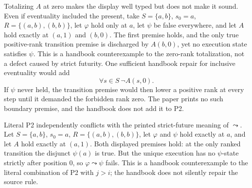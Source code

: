 Totalizing \(A\) at zero makes the display well typed but does not make it
sound.  Even if eventuality included the present, take
\(S=\{a,b\}\), \(s_0=a\), \(R=\{(a,b),(b,b)\}\), let \(\varphi\) hold only at
\(a\), let \(\psi\) be false everywhere, and let \(A\) hold exactly at
\((a,1)\) and \((b,0)\).  The first premise holds, and the only true
positive-rank transition premise is discharged by \(A(b,0)\), yet no execution
state satisfies \(\psi\).  This is a handbook counterexample to the zero-rank
totalization, not a defect caused by strict futurity.  One sufficient handbook
repair for inclusive eventuality would add
\[
 \forall s\in S\ \neg A(s,0).
\]
If \(\psi\) never held, the transition premise would then lower a positive rank
at every step until it demanded the forbidden rank zero.  The paper prints no
such boundary premise, and the handbook does not add it to P2.

Literal P2 independently conflicts with the printed strict-future meaning of
\(\leadsto\).  Let \(S=\{a,b\}\), \(s_0=a\),
\(R=\{(a,b),(b,b)\}\), let \(\varphi\) and \(\psi\) hold exactly at \(a\),
and let \(A\) hold exactly at \((a,1)\).  Both displayed premises hold: at the
only ranked transition the disjunct \(\psi(a)\) is true.  But the unique
execution has no \(\psi\)-state strictly after position \(0\), so
\(\varphi\leadsto\psi\) fails.  This is a handbook counterexample to the
literal combination of P2 with \(j>i\); the handbook does not silently repair
the source rule.


